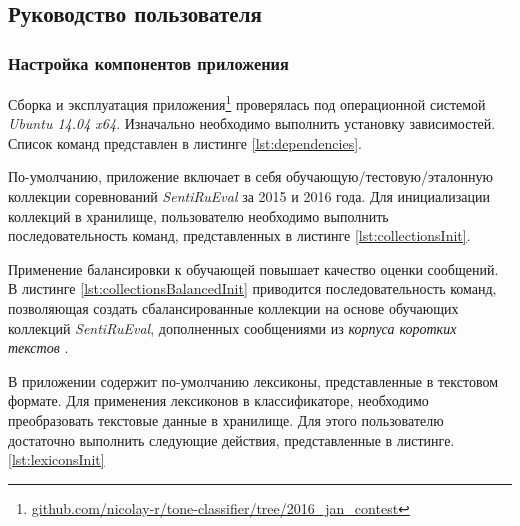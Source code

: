 \subsection{Руководство пользователя}
    \subsubsection{Настройка компонентов приложения}
    Сборка и эксплуатация приложения\footnote{ \url{github.com/nicolay-r/tone-classifier/tree/2016_jan_contest}
    }
    проверялась под операционной системой
    {\it Ubuntu 14.04 x64}.
    Изначально необходимо выполнить установку зависимостей.
    Список команд представлен в листинге \ref{lst:dependencies}.
    \lstset{style=bash}
    

        По-умолчанию, приложение включает в себя обучающую/тестовую/эталонную
        коллекции соревнований {\it SentiRuEval} за 2015 и 2016 года. Для
        инициализации коллекций в хранилище, пользователю необходимо выполнить
        последовательность команд, представленных в листинге \ref{lst:collectionsInit}.
        \lstset{style=bash}
        

        Применение балансировки к обучающей повышает качество оценки сообщений.
        \cite{diploma2015} В листинге \ref{lst:collectionsBalancedInit} приводится
        последовательность команд, позволяющая создать сбалансированные коллекции
        на основе обучающих коллекций {\it SentiRuEval}, дополненных сообщениями
        из {\it корпуса коротких текстов} \cite{rubtsovaCollection}.
        \lstset{style=bash}
        

        В приложении содержит по-умолчанию лексиконы, представленные в текстовом
        формате. Для применения лексиконов в классификаторе, необходимо преобразовать
        текстовые данные в хранилище. Для этого пользователю
        достаточно выполнить следующие действия, представленные в листинге.
        \ref{lst:lexiconsInit}
        \lstset{style=bash}
        

